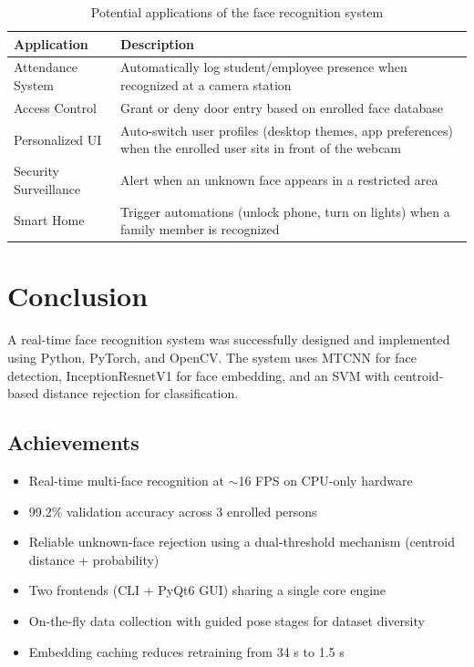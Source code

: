 \documentclass[12pt,a4paper]{article}
\begin{document}
\begin{table}[H]
\centering
\begin{tabular}{lp{10cm}}
\toprule
\textbf{Application} & \textbf{Description} \\
\midrule
Attendance System & Automatically log student/employee presence when recognized at a camera station \\
Access Control & Grant or deny door entry based on enrolled face database \\
Personalized UI & Auto-switch user profiles (desktop themes, app preferences) when the enrolled user sits in front of the webcam \\
Security Surveillance & Alert when an unknown face appears in a restricted area \\
Smart Home & Trigger automations (unlock phone, turn on lights) when a family member is recognized \\
\bottomrule
\end{tabular}
\caption{Potential applications of the face recognition system}
\end{table}

\section{Conclusion}

A real-time face recognition system was successfully designed and implemented using Python, PyTorch, and OpenCV. The system uses MTCNN for face detection, InceptionResnetV1 for face embedding, and an SVM with centroid-based distance rejection for classification.

\subsection*{Achievements}
\begin{itemize}
    \item Real-time multi-face recognition at $\sim$16 FPS on CPU-only hardware
    \item 99.2\% validation accuracy across 3 enrolled persons
    \item Reliable unknown-face rejection using a dual-threshold mechanism (centroid distance + probability)
    \item Two frontends (CLI + PyQt6 GUI) sharing a single core engine
    \item On-the-fly data collection with guided pose stages for dataset diversity
    \item Embedding caching reduces retraining from 34 s to 1.5 s
\end{itemize}
\end{document}
